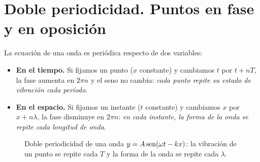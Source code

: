 \section{Doble periodicidad. Puntos en fase y en oposición}\label{sec:ond-periodicidad}

La ecuación de una onda es periódica respecto de dos variables:
\begin{itemize}
    \item \textbf{En el tiempo.} Si fijamos un punto (\(x\) constante) y cambiamos \(t\) por \(t + nT\), la fase aumenta en
    \(2\pi n\) y el seno no cambia: \emph{cada punto repite su estado de vibración cada período}.
    \item \textbf{En el espacio.} Si fijamos un instante (\(t\) constante) y cambiamos \(x\) por \(x + n\lambda\), la fase
    disminuye en \(2\pi n\): \emph{en cada instante, la forma de la onda se repite cada longitud de onda}.
\end{itemize}

\begin{figure}[H]
    \centering
    \hfill
    \caption{Doble periodicidad de una onda \(y = A\operatorname{sen}(\omega t - kx)\): la vibración de un punto se repite cada \(T\) y la
    forma de la onda se repite cada \(\lambda\).}
    \label{fig:ond-periodicidad}
\end{figure}

